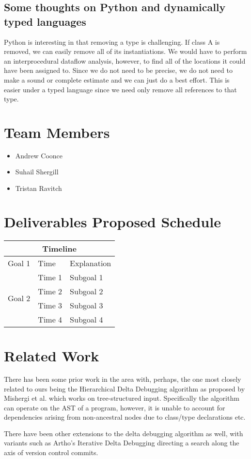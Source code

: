 \documentclass[11pt]{article}
\begin{document}
\subsection{Some thoughts on Python and dynamically typed languages}
Python is interesting in that removing a type is challenging. If class A is
removed, we can easily remove all of its instantiations. We would have to
perform an interprocedural dataflow analysis, however, to find all of the
locations it could have been assigned to. Since we do not need to be precise, we
do not need to make a sound or complete estimate and we can just do a best
effort. This is easier under a typed language since we need only remove all
references to that type.


\section{Team Members}
\begin{itemize}
\item{Andrew Coonce}
\item{Suhail Shergill}
\item{Tristan Ravitch}
\end{itemize}

\section{Deliverables Proposed Schedule}
\begin{tabular}{|l|l|l|}
\hline
\multicolumn{3}{|c|}{Timeline} \\
\hline
Goal 1 & Time & Explanation \\ \hline
\multirow{4}{*}{Goal 2} & Time 1 & Subgoal 1 \\
 & Time 2 & Subgoal 2 \\
 & Time 3 & Subgoal 3 \\
 & Time 4 & Subgoal 4 \\ \hline
\end{tabular}



\section{Related Work}
There has been some prior work in the area with, perhaps, the one most closely
related to ours being the Hierarchical Delta Debugging algorithm as proposed by
Mishergi et al. \cite{hdd} which works on tree-structured input. Specifically
the algorithm can operate on the AST of a program, however, it is unable to
account for dependencies arising from non-ancestral nodes due to class/type
declarations etc.

There have been other extensions to the delta debugging algorithm as well, with
variants such as Artho's Iterative Delta Debugging \cite{idd} directing a search
along the axis of version control commits.



\end{document}
